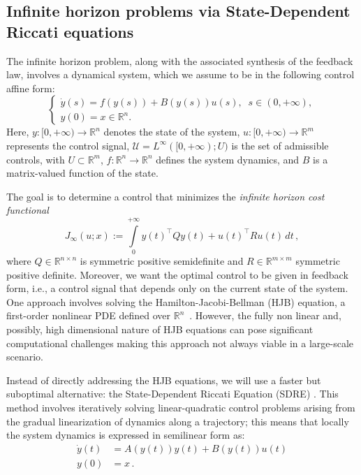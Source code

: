 \documentclass[a4paper,10pt]{article}
\newcommand{\R}{\mathbb{R}}
\begin{document}
\subsection{Infinite horizon problems via State-Dependent Riccati equations}\label{sec:intro-appl}

The infinite horizon problem, along with the associated synthesis of the feedback law, involves a dynamical system, which we assume to be in the following control affine form:
\begin{equation*}\label{eq}
	\left\{ \begin{array}{l}
		\dot{y}(s)=f(y(s)) + B(y(s))u(s), \;\; s\in(0,+\infty),\\
		y(0)=x\in\mathbb{R}^n.
	\end{array} \right.
\end{equation*}
Here, $y:[0,+\infty)\rightarrow\R^n$ denotes the state of the system, $u:[0,+\infty)\rightarrow\R^m$ represents the control signal,  $\mathcal{U}=L^\infty ([0,+\infty);U)$ is the set of admissible controls, with $U\subset \R^m$, $f:\R^n\rightarrow\R^n$ defines the system dynamics, and $B$ is a matrix-valued function of the state.

\noindent The goal is to determine a control that minimizes the \emph{infinite horizon cost functional} 
\begin{equation*}
	J_{\infty}(u;x) := \int\limits_0^{+\infty} y(t)^\top Q y(t) + u(t)^\top R u(t)\, dt \,,
	\label{quadratic_cost}
\end{equation*}
where $Q \in \mathbb{R}^{n\times n}$ is symmetric positive semidefinite and $ R \in \mathbb{R}^{m\times m}$ symmetric positive definite. Moreover, we want the optimal control to be given in feedback form, i.e., a control signal that depends only on the current state of the system. One approach involves solving the Hamilton-Jacobi-Bellman (HJB) equation, a first-order nonlinear PDE defined over $\R^n$~\cite{bardi1997optimal}. However, the fully non linear and, possibly, high dimensional nature of HJB equations can pose significant computational challenges making this approach not always viable in a large-scale scenario. 

Instead of directly addressing the HJB equations, we will use a faster but suboptimal alternative: the State-Dependent Riccati Equation (SDRE) \cite{ccimen2008state}.
This method involves iteratively solving linear-quadratic control problems arising from the gradual linearization of dynamics along a trajectory; this means that locally the system dynamics is expressed in semilinear form as:
\begin{align*}
	\dot{y}(t) & = A(y(t)) y(t) +B(y(t)) u(t) \\
	y(0) & = x\,.
	\label{semilinear}
\end{align*}
\end{document}
